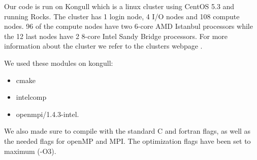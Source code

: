 Our code is run on Kongull which is a linux cluster using CentOS 5.3 and running Rocks. The cluster has 1 login node, 4 I/O nodes and 108 compute nodes. 96 of the compute nodes have two 6-core AMD Istanbul processors while the 12 last nodes have 2 8-core Intel Sandy Bridge processors. For more information about the cluster we refer to the clusters webpage \cite{kongull}.

We used these modules on kongull:
\begin{itemize}
\item cmake
\item intelcomp
\item openmpi/1.4.3-intel.
\end{itemize}
We also made sure to compile with the standard C and fortran flags, as well as the needed flags for openMP and MPI. The optimization flags have been set to maximum (-O3).
